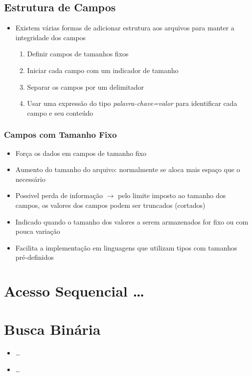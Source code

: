 \documentclass[12pt]{article}
\begin{document}
    \subsection{Estrutura de Campos}
    \begin{itemize}
        \item Existem várias formas de adicionar estrutura aos arquivos para 
        manter a integridade dos campos
        \begin{enumerate}
            \item Definir campos de tamanhos fixos
            \item Iniciar cada campo com um indicador de tamanho
            \item Separar os campos por um delimitador
            \item Usar uma expressão do tipo \textit{palavra-chave=valor} para 
            identificar cada campo e seu conteúdo
        \end{enumerate}
    \end{itemize}
        \subsubsection{Campos com Tamanho Fixo}
        \begin{itemize}
            \item Força os dados em campos de tamanho fixo
            \item Aumento do tamanho do arquivo: normalmente se aloca mais 
            espaço que o necessário
            \item Possivel perda de informação $\rightarrow$ pelo limite imposto 
            ao tamanho dos campos, os valores dos campos podem ser truncados 
            (cortados)
            \item Indicado quando o tamanho dos valores a serem armazenados for 
            fixo ou com pouca variação
            \item Facilita a implementação em linguagens que utilizam tipos com 
            tamanhos pré-definidos
        \end{itemize}
            
\section{Acesso Sequencial \dots}

\section{Busca Binária}
\begin{itemize}
    \item \dots
    \item \dots
\end{itemize}
\end{document}
